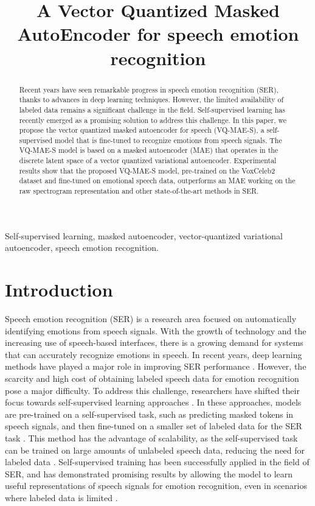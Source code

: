 \documentclass{article}
\title{A Vector Quantized Masked AutoEncoder for speech emotion recognition}
\begin{document}
\ninept
\maketitle
\begin{abstract}
Recent years have seen remarkable progress in speech emotion recognition (SER), thanks to advances in deep learning techniques. However, the limited availability of labeled data remains a significant challenge in the field. Self-supervised learning has recently emerged as a promising solution to address this challenge. In this paper, we propose the vector quantized masked autoencoder for speech (VQ-MAE-S), a self-supervised model that is fine-tuned to recognize emotions from speech signals. The VQ-MAE-S model is based on a masked autoencoder (MAE) that operates in the discrete latent space of a vector quantized variational autoencoder. Experimental results show that the proposed VQ-MAE-S model, pre-trained on the VoxCeleb2 dataset and fine-tuned on emotional speech data, outperforms an MAE working on the  raw spectrogram representation and other state-of-the-art methods in SER.
\end{abstract}
\begin{keywords}
Self-supervised learning, masked autoencoder, vector-quantized variational autoencoder, speech emotion recognition. 
\end{keywords}
\section{Introduction}
\label{sec:intro}
Speech emotion recognition (SER) \cite{el2011survey} is a research area focused on automatically identifying emotions from speech signals. With the growth of technology and the increasing use of speech-based interfaces, there is a growing demand for systems that can accurately recognize emotions in speech. In recent years, deep learning methods have played a major role in improving SER performance \cite{akccay2020speech}. However, the scarcity and high cost of obtaining labeled speech data for emotion recognition pose a major difficulty. To address this challenge, researchers have shifted their focus towards self-supervised learning approaches \cite{wang2021fine, chen2021exploring}. In these approaches, models are pre-trained on a self-supervised task, such as predicting masked tokens in speech signals, and then fine-tuned on a smaller set of labeled data for the SER task \cite{gong2022ssast, pepino2021emotion}. This method has the advantage of scalability, as the self-supervised task can be trained on large amounts of unlabeled speech data, reducing the need for labeled data \cite{liu2022audio, zhang2022survey}. Self-supervised training has been successfully applied in the field of SER, and has demonstrated promising results by allowing the model to learn useful representations of speech signals for emotion recognition, even in scenarios where labeled data is limited \cite{pepino2021emotion, macary2021use}.
\end{document}
